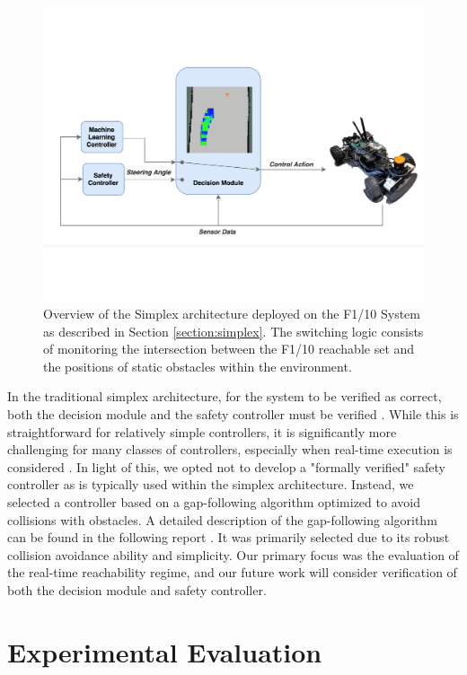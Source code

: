 \documentclass[manuscript,screen,review]{acmart}
\newcommand{\todo}[1]{\textcolor{red}{\textbf{\underline{TODO:}} #1}}
\begin{document}
\begin{figure}[htbp]%
  \centering
  \includegraphics[width=0.8\linewidth]{figures/simplex_real.pdf}
  \caption{Overview of the Simplex architecture deployed on the F1/10 System as described in Section \ref{section:simplex}. The switching logic consists of monitoring the intersection between the F1/10 reachable set and the positions of static obstacles within the environment.}
  \label{fig:simplex_arch}
\end{figure}%


In the traditional simplex architecture, for the system to be verified as correct, both the decision module and the safety controller must be verified \cite{Mehmood2021}. While this is straightforward for relatively simple controllers, it is significantly more challenging for many classes of controllers, especially when real-time execution is considered \cite{ivanov2020case}. In light of this, we opted not to develop a "formally verified" safety controller as is typically used within the simplex architecture. Instead, we selected a controller based on a gap-following algorithm optimized to avoid collisions with obstacles. A detailed description of the gap-following algorithm can be found in the following report \cite{otterness_2019}. It was primarily selected due to its robust collision avoidance ability and simplicity. Our primary focus was the evaluation of the real-time reachability regime, and our future work will consider verification of both the decision module and safety controller. 


\section{Experimental Evaluation}
\label{sec:experiments}
\end{document}
